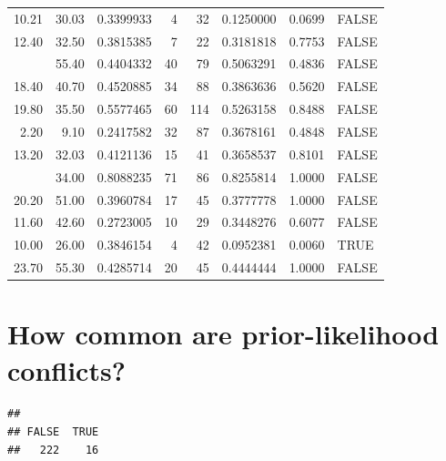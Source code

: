 \documentclass[12pt,a4paper]{article}
\newenvironment{Shaded}{\begin{snugshade}}{\end{snugshade}}
\newcommand{\KeywordTok}[1]{\textcolor[rgb]{0.13,0.29,0.53}{\textbf{#1}}}
\newcommand{\DecValTok}[1]{\textcolor[rgb]{0.00,0.00,0.81}{#1}}
\newcommand{\StringTok}[1]{\textcolor[rgb]{0.31,0.60,0.02}{#1}}
\newcommand{\OperatorTok}[1]{\textcolor[rgb]{0.81,0.36,0.00}{\textbf{#1}}}
\newcommand{\NormalTok}[1]{#1}
\begin{document}
\begin{table}[H]
{\begin{tabular}[t]{rrrrrrrl}
10.21 & 30.03 & 0.3399933 & 4 & 32 & 0.1250000 & 0.0699 & FALSE\\
12.40 & 32.50 & 0.3815385 & 7 & 22 & 0.3181818 & 0.7753 & FALSE\\
\addlinespace
24.40 & 55.40 & 0.4404332 & 40 & 79 & 0.5063291 & 0.4836 & FALSE\\
18.40 & 40.70 & 0.4520885 & 34 & 88 & 0.3863636 & 0.5620 & FALSE\\
19.80 & 35.50 & 0.5577465 & 60 & 114 & 0.5263158 & 0.8488 & FALSE\\
2.20 & 9.10 & 0.2417582 & 32 & 87 & 0.3678161 & 0.4848 & FALSE\\
13.20 & 32.03 & 0.4121136 & 15 & 41 & 0.3658537 & 0.8101 & FALSE\\
\addlinespace
27.50 & 34.00 & 0.8088235 & 71 & 86 & 0.8255814 & 1.0000 & FALSE\\
20.20 & 51.00 & 0.3960784 & 17 & 45 & 0.3777778 & 1.0000 & FALSE\\
11.60 & 42.60 & 0.2723005 & 10 & 29 & 0.3448276 & 0.6077 & FALSE\\
10.00 & 26.00 & 0.3846154 & 4 & 42 & 0.0952381 & 0.0060 & TRUE\\
23.70 & 55.30 & 0.4285714 & 20 & 45 & 0.4444444 & 1.0000 & FALSE\\
\bottomrule
\end{tabular}}
\end{table}

\newpage

\hypertarget{how-common-are-prior-likelihood-conflicts}{%
\section{How common are prior-likelihood
conflicts?}\label{how-common-are-prior-likelihood-conflicts}}

\begin{Shaded}
\end{Shaded}

\begin{verbatim}
## 
## FALSE  TRUE 
##   222    16
\end{verbatim}

\begin{Shaded}
\end{Shaded}
\end{document}
